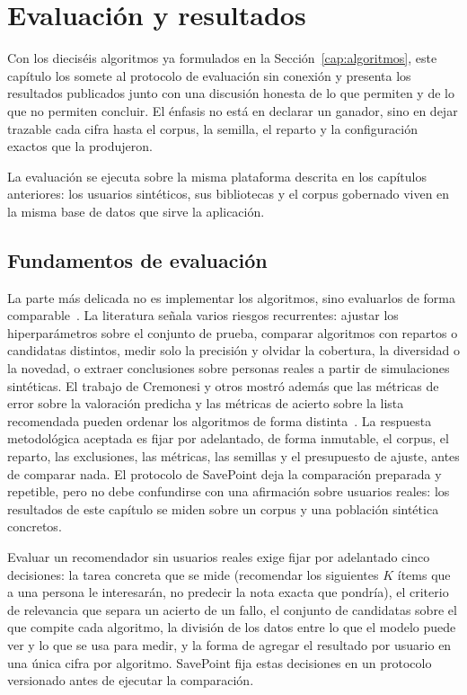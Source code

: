 \chapter{Evaluación y resultados}\label{cap:resultados}\label{cap:experimentos}

Con los dieciséis algoritmos ya formulados en la Sección~\ref{cap:algoritmos}, este capítulo los somete al protocolo de evaluación
sin conexión y presenta los resultados publicados junto con una discusión honesta de lo que permiten y de lo que no
permiten concluir. El énfasis no está en declarar un ganador, sino en dejar trazable cada cifra
hasta el corpus, la semilla, el reparto y la configuración exactos que la produjeron.

La evaluación se ejecuta sobre la misma plataforma descrita en los capítulos anteriores: los
usuarios sintéticos, sus bibliotecas y el corpus gobernado viven en la misma base de datos que
sirve la aplicación.

\section{Fundamentos de evaluación}\label{sec:exp-fundamentos}

La parte más delicada no es implementar los algoritmos, sino evaluarlos de forma
comparable~\cite{herlocker2004evaluating, gunawardana2015evaluating}. La literatura señala
varios riesgos recurrentes: ajustar los hiperparámetros sobre el conjunto de prueba, comparar
algoritmos con repartos o candidatas distintos, medir solo la precisión y olvidar la
cobertura, la diversidad o la novedad, o extraer conclusiones sobre personas reales a partir
de simulaciones sintéticas. El trabajo de Cremonesi y otros mostró además que las métricas de
error sobre la valoración predicha y las métricas de acierto sobre la lista recomendada
pueden ordenar los algoritmos de forma distinta~\cite{cremonesi2010performance}. La respuesta
metodológica aceptada es fijar por adelantado, de forma inmutable, el corpus, el reparto, las
exclusiones, las métricas, las semillas y el presupuesto de ajuste, antes de comparar nada.
El protocolo de SavePoint deja la comparación preparada y repetible, pero no debe confundirse
con una afirmación sobre usuarios reales: los resultados de este capítulo se miden sobre un
corpus y una población sintética concretos.

Evaluar un recomendador sin usuarios reales exige fijar por adelantado cinco decisiones: la
tarea concreta que se mide (recomendar los siguientes \(K\) ítems que a una persona le
interesarán, no predecir la nota exacta que pondría), el criterio de relevancia que separa un
acierto de un fallo, el conjunto de candidatas sobre el que compite cada algoritmo, la división
de los datos entre lo que el modelo puede ver y lo que se usa para medir, y la forma de agregar
el resultado por usuario en una única cifra por algoritmo. SavePoint fija estas decisiones en
un protocolo versionado antes de ejecutar la comparación.


